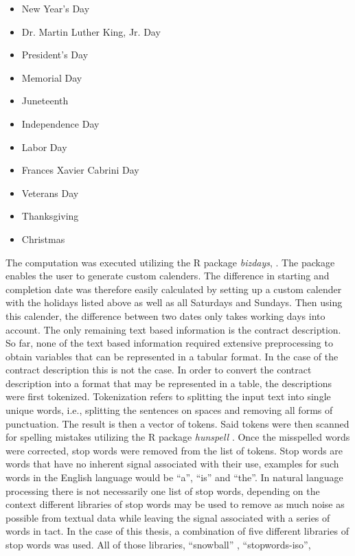\documentclass[a4paper,12pt, headsepline]{scrartcl}
\numberwithin{equation}{section}
\begin{document}
 \begin{itemize}
 	\item New Year's Day
 	\item Dr. Martin Luther King, Jr. Day
 	\item President's Day
 	\item Memorial Day
 	\item Juneteenth
 	\item Independence Day
 	\item Labor Day
 	\item Frances Xavier Cabrini Day
 	\item Veterans Day
 	\item Thanksgiving
 	\item Christmas
 \end{itemize}
 
 The computation was executed utilizing the R package \textit{bizdays}, \citet{bizdays}. The package enables the user to generate custom calenders. The difference in starting and completion date was therefore easily calculated by setting up a custom calender with the holidays listed above as well as all Saturdays and Sundays. Then using this calender, the difference between two dates only takes working days into account.
 The only remaining text based information is the contract description. So far, none of the text based information required extensive preprocessing to obtain variables that can be represented in a tabular format. In the case of the contract description this is not the case. In order to convert the contract description into a format that may be represented in a table, the descriptions were first tokenized. Tokenization refers to splitting the input text into single unique words, i.e., splitting the sentences on spaces and removing all forms of punctuation. The result is then a vector of tokens. Said tokens were then scanned for spelling mistakes utilizing the R package \textit{hunspell} \citep{hunspell}. Once the misspelled words were corrected, stop words were removed from the list of tokens. Stop words are words that have no inherent signal associated with their use, examples for such words in the English language would be \enquote{a}, \enquote{is} and \enquote{the}. In natural language processing there is not necessarily one list of stop words, depending on the context different libraries of stop words may be used to remove as much noise as possible from textual data while leaving the signal associated with a series of words in tact. In the case of this thesis, a combination of five different libraries of stop words was used. All of those libraries, \enquote{snowball} , \enquote{stopwords-iso}, 
\end{document}
